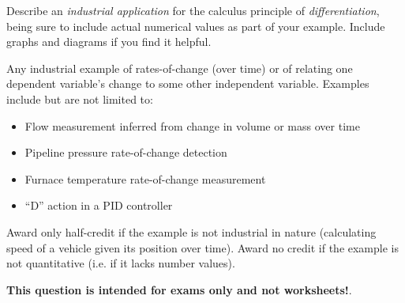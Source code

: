 

Describe an {\it industrial application} for the calculus principle of {\it differentiation}, being sure to include actual numerical values as part of your example.  Include graphs and diagrams if you find it helpful.

\vskip 100pt







Any industrial example of rates-of-change (over time) or of relating one dependent variable's change to some other independent variable.  Examples include but are not limited to:

\begin{itemize}
\item{} Flow measurement inferred from change in volume or mass over time
\item{} Pipeline pressure rate-of-change detection
\item{} Furnace temperature rate-of-change measurement
\item{} ``D'' action in a PID controller
\end{itemize}

Award only half-credit if the example is not industrial in nature (calculating speed of a vehicle given its position over time).  Award no credit if the example is not quantitative (i.e. if it lacks number values).







{\bf This question is intended for exams only and not worksheets!}.



